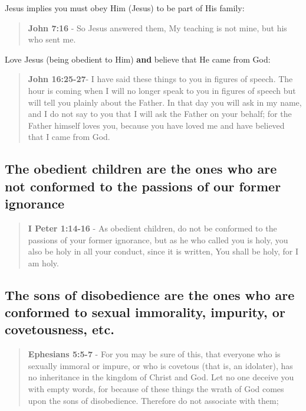 \documentclass[11pt]{article}
\begin{document}
Jesus implies you must obey Him (Jesus) to be part of His family:

\begin{quote}
\textbf{John 7:16} - So Jesus answered them, My teaching is not mine, but his who sent me.
\end{quote}

Love Jesus (being obedient to Him) \textbf{and} believe that He came from God:

\begin{quote}
\textbf{John 16:25-27}- I have said these things to you in figures of speech. The hour is coming when I will no longer speak to you in figures of speech but will tell you plainly about the Father. In that day you will ask in my name, and I do not say to you that I will ask the Father on your behalf; for the Father himself loves you, because you have loved me and have believed that I came from God.
\end{quote}

\subsection{The obedient children are the ones who are not conformed to the passions of our former ignorance}
\label{sec:orga95a305}
\begin{quote}
\textbf{I Peter 1:14-16} - As obedient children, do not be conformed to the passions of your former ignorance, but as he who called you is holy, you also be holy in all your conduct, since it is written, You shall be holy, for I am holy.
\end{quote}

\subsection{The sons of disobedience are the ones who are conformed to sexual immorality, impurity, or covetousness, etc.}
\label{sec:org84779bc}
\begin{quote}
\textbf{Ephesians 5:5-7} - For you may be sure of this, that everyone who is sexually immoral or impure, or who is covetous (that is, an idolater), has no inheritance in the kingdom of Christ and God. Let no one deceive you with empty words, for because of these things the wrath of God comes upon the sons of disobedience. Therefore do not associate with them;
\end{quote}
\end{document}
